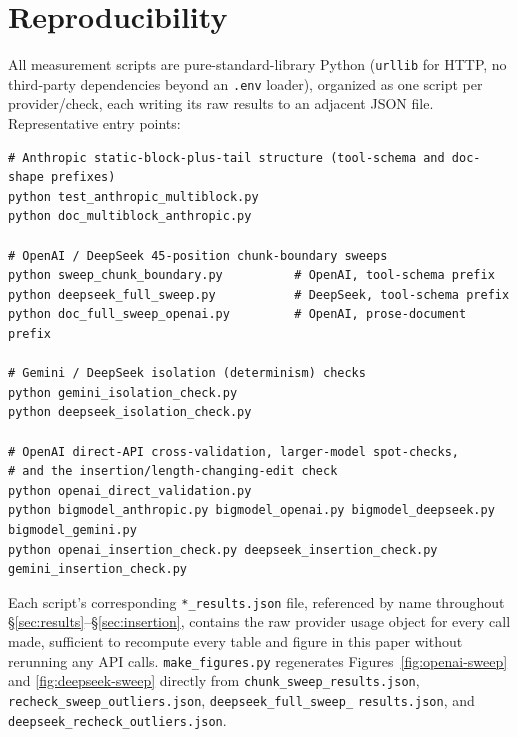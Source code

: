 \documentclass[11pt]{article}
\newcommand{\pkg}[1]{\texttt{#1}}
\newcommand{\code}[1]{\texttt{#1}}
\begin{document}
\appendix
\section{Reproducibility}
All measurement scripts are pure-standard-library Python (\pkg{urllib} for
HTTP, no third-party dependencies beyond an \code{.env} loader), organized
as one script per provider/check, each writing its raw results to an
adjacent JSON file. Representative entry points:
\begin{lstlisting}
# Anthropic static-block-plus-tail structure (tool-schema and doc-shape prefixes)
python test_anthropic_multiblock.py
python doc_multiblock_anthropic.py

# OpenAI / DeepSeek 45-position chunk-boundary sweeps
python sweep_chunk_boundary.py          # OpenAI, tool-schema prefix
python deepseek_full_sweep.py           # DeepSeek, tool-schema prefix
python doc_full_sweep_openai.py         # OpenAI, prose-document prefix

# Gemini / DeepSeek isolation (determinism) checks
python gemini_isolation_check.py
python deepseek_isolation_check.py

# OpenAI direct-API cross-validation, larger-model spot-checks,
# and the insertion/length-changing-edit check
python openai_direct_validation.py
python bigmodel_anthropic.py bigmodel_openai.py bigmodel_deepseek.py bigmodel_gemini.py
python openai_insertion_check.py deepseek_insertion_check.py gemini_insertion_check.py
\end{lstlisting}
Each script's corresponding \code{*\_results.json} file, referenced by name
throughout \S\ref{sec:results}--\S\ref{sec:insertion}, contains the raw
provider usage object for every call made, sufficient to recompute every
table and figure in this paper without rerunning any API calls.
\code{make\_figures.py} regenerates Figures~\ref{fig:openai-sweep} and
\ref{fig:deepseek-sweep} directly from \code{chunk\_sweep\_results.json},
\code{recheck\_sweep\_outliers.json}, \code{deepseek\_full\_sweep\_}
\code{results.json}, and \code{deepseek\_recheck\_outliers.json}.
\end{document}

